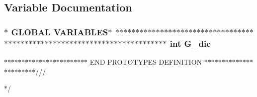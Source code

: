 \subsection{Variable Documentation}
\subsubsection[{G\_\-dic}]{\setlength{\rightskip}{0pt plus 5cm}$\ast$ GLOBAL VARIABLES$\ast$ $\ast$$\ast$$\ast$$\ast$$\ast$$\ast$$\ast$$\ast$$\ast$$\ast$$\ast$$\ast$$\ast$$\ast$$\ast$$\ast$$\ast$$\ast$$\ast$$\ast$$\ast$$\ast$$\ast$$\ast$$\ast$$\ast$$\ast$$\ast$$\ast$$\ast$$\ast$$\ast$$\ast$$\ast$$\ast$$\ast$$\ast$$\ast$$\ast$$\ast$$\ast$$\ast$$\ast$$\ast$$\ast$$\ast$$\ast$$\ast$$\ast$$\ast$$\ast$$\ast$$\ast$$\ast$$\ast$$\ast$$\ast$$\ast$$\ast$$\ast$$\ast$$\ast$$\ast$$\ast$$\ast$$\ast$$\ast$$\ast$$\ast$$\ast$$\ast$$\ast$$\ast$$\ast$ int {\bf G\_\-dic}}\label{d0/d29/main_8c_a8b2232e2d398e8c93aa34fc99d1d11be}


$\ast$$\ast$$\ast$$\ast$$\ast$$\ast$$\ast$$\ast$$\ast$$\ast$$\ast$$\ast$$\ast$$\ast$$\ast$$\ast$$\ast$$\ast$$\ast$$\ast$$\ast$$\ast$$\ast$$\ast$ END PROTOTYPES DEFINITION $\ast$$\ast$$\ast$$\ast$$\ast$$\ast$$\ast$$\ast$$\ast$$\ast$$\ast$$\ast$$\ast$$\ast$$\ast$$\ast$$\ast$$\ast$$\ast$$\ast$$\ast$$\ast$$\ast$/// 

$\ast$/ 